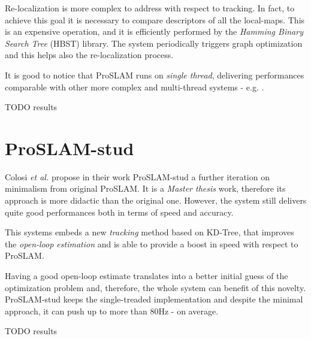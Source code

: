 Re-localization is more complex to address with respect to tracking. In fact, to achieve this goal it is necessary to compare descriptors of all the local-maps. This is an expensive operation, and it is efficiently performed by the \textit{Hamming Binary Search Tree} (HBST) \cite{schlegel2016hbst} library. The system periodically triggers graph optimization and this helps also the re-localization process.

It is good to notice that ProSLAM runs on \textit{single thread}, delivering performances comparable with other more complex and multi-thread systems - e.g. \cite{mur2017orb-slam2}.

TODO results

\section{ProSLAM-stud}\label{sec:froslam}
Colosi \textit{et al.} propose in their work ProSLAM-stud \cite{colosi2017froslam} a further iteration on minimalism from original ProSLAM. It is a \textit{Master thesis} work, therefore its approach is more didactic than the original one. However, the system still delivers quite good performances both in terms of speed and accuracy. 

This systems embeds a new \textit{tracking} method based on KD-Tree, that improves the \textit{open-loop estimation} and is able to provide a boost in speed with respect to ProSLAM. 

Having a good open-loop estimate translates into a better initial guess of the optimization problem and, therefore, the whole system can benefit of this novelty. ProSLAM-stud keeps the single-treaded implementation and despite the minimal approach, it can push up to more than 80Hz - on average.

TODO results